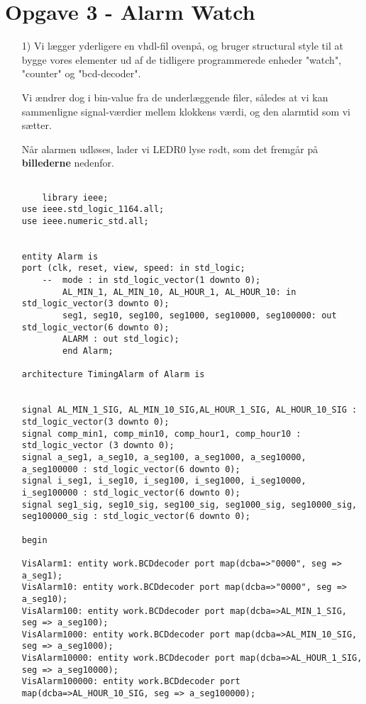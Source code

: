 \section{Opgave 3 - Alarm Watch}
\begin{enumerate}
	\item[1)]
	Vi lægger yderligere en vhdl-fil ovenpå, og bruger structural style til at bygge vores elementer ud af de tidligere programmerede enheder "watch", "counter" og "bcd-decoder". 
	
	Vi ændrer dog i bin-value fra de underlæggende filer, således at vi kan sammenligne signal-værdier mellem klokkens værdi, og den alarmtid som vi sætter. 
	
	Når alarmen udløses, lader vi LEDR0 lyse rødt, som det fremgår på \textbf{billederne} nedenfor.
	
		\begin{lstlisting}[caption={Koden for øverste lag af Alarm Watch},label={lst:alarmWatch}]
		
	library ieee;
use ieee.std_logic_1164.all;
use ieee.numeric_std.all;


entity Alarm is
port (clk, reset, view, speed: in std_logic;
	--	mode : in std_logic_vector(1 downto 0);
		AL_MIN_1, AL_MIN_10, AL_HOUR_1, AL_HOUR_10: in std_logic_vector(3 downto 0);
		seg1, seg10, seg100, seg1000, seg10000, seg100000: out std_logic_vector(6 downto 0);
		ALARM : out std_logic);
		end Alarm;
		
architecture TimingAlarm of Alarm is


signal AL_MIN_1_SIG, AL_MIN_10_SIG,AL_HOUR_1_SIG, AL_HOUR_10_SIG : std_logic_vector(3 downto 0);
signal comp_min1, comp_min10, comp_hour1, comp_hour10 : std_logic_vector (3 downto 0);
signal a_seg1, a_seg10, a_seg100, a_seg1000, a_seg10000, a_seg100000 : std_logic_vector(6 downto 0);
signal i_seg1, i_seg10, i_seg100, i_seg1000, i_seg10000, i_seg100000 : std_logic_vector(6 downto 0);
signal seg1_sig, seg10_sig, seg100_sig, seg1000_sig, seg10000_sig, seg100000_sig : std_logic_vector(6 downto 0);

begin

VisAlarm1: entity work.BCDdecoder port map(dcba=>"0000", seg => a_seg1);
VisAlarm10: entity work.BCDdecoder port map(dcba=>"0000", seg => a_seg10);
VisAlarm100: entity work.BCDdecoder port map(dcba=>AL_MIN_1_SIG, seg => a_seg100);
VisAlarm1000: entity work.BCDdecoder port map(dcba=>AL_MIN_10_SIG, seg => a_seg1000);
VisAlarm10000: entity work.BCDdecoder port map(dcba=>AL_HOUR_1_SIG, seg => a_seg10000);
VisAlarm100000: entity work.BCDdecoder port map(dcba=>AL_HOUR_10_SIG, seg => a_seg100000);


\end{lstlisting}
\end{enumerate}
